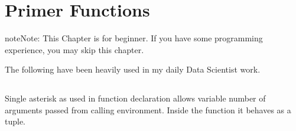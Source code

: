 \documentclass[letterpaper,12pt,english]{sphinxmanual}
\begin{document}
\chapter{Primer Functions}
\label{\detokenize{primer:primer-functions}}\label{\detokenize{primer:primer}}\label{\detokenize{primer::doc}}
\begin{sphinxadmonition}{note}{Note:}
\sphinxAtStartPar
This Chapter {\hyperref[\detokenize{primer:primer}]{}} is for beginner.  If you have some  programming experience, you may skip this chapter.
\end{sphinxadmonition}

\sphinxAtStartPar
The following  have been heavily used in my daily Data Scientist work.


\section{\sphinxstyleliteralintitle{\sphinxupquote{*}}}
\label{\detokenize{primer:id1}}
\sphinxAtStartPar
Single asterisk as used in function declaration allows variable number of arguments passed from calling environment. Inside the function it behaves as a tuple.

\sphinxAtStartPar
{}
\begin{quote}

\begin{sphinxVerbatim}[commandchars=\\\{\}]
  \PYG{p}{[}\PYG{p}{]}
\end{sphinxVerbatim}
\end{quote}

\sphinxAtStartPar
{}
\begin{quote}

\begin{sphinxVerbatim}[commandchars=\\\{\}]
\PYG{p}{[}  \PYG{p}{]}
  
\end{sphinxVerbatim}
\end{quote}
\end{document}
